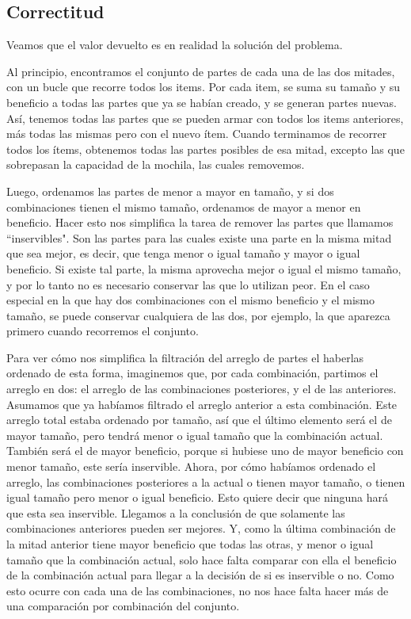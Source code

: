 \documentclass[10pt, a4paper]{article}
\begin{document}
\subsection{Correctitud}
Veamos que el valor devuelto es en realidad la solución del problema. \par
Al principio, encontramos el conjunto de partes de cada una de las dos mitades, con un bucle que recorre todos los items. Por cada item, se suma su tamaño y su beneficio a todas las partes que ya se habían creado, y se generan partes nuevas. Así, tenemos todas las partes que se pueden armar con todos los items anteriores, más todas las mismas pero con el nuevo ítem. Cuando terminamos de recorrer todos los ítems, obtenemos todas las partes posibles de esa mitad, excepto las que sobrepasan la capacidad de la mochila, las cuales removemos.\par
Luego, ordenamos las partes de menor a mayor en tamaño, y si dos combinaciones tienen el mismo tamaño, ordenamos de mayor a menor en beneficio. Hacer esto nos simplifica la tarea de remover las partes que llamamos ``inservibles". Son las partes para las cuales existe una parte en la misma mitad que sea mejor, es decir, que tenga menor o igual tamaño y mayor o igual beneficio. Si existe tal parte, la misma aprovecha mejor o igual el mismo tamaño, y por lo tanto no es necesario conservar las que lo utilizan peor. En el caso especial en la que hay dos combinaciones con el mismo beneficio y el mismo tamaño, se puede conservar cualquiera de las dos, por ejemplo, la que aparezca primero cuando recorremos el conjunto.\par
Para ver cómo nos simplifica la filtración del arreglo de partes el haberlas ordenado de esta forma, imaginemos que, por cada combinación, partimos el arreglo en dos: el arreglo de las combinaciones posteriores, y el de las anteriores. Asumamos que ya habíamos filtrado el arreglo anterior a esta combinación. Este arreglo total estaba ordenado por tamaño, así que el último elemento será el de mayor tamaño, pero tendrá menor o igual tamaño que la combinación actual. También será el de mayor beneficio, porque si hubiese uno de mayor beneficio con menor tamaño, este sería inservible. Ahora, por cómo habíamos ordenado el arreglo, las combinaciones posteriores a la actual o tienen mayor tamaño, o tienen igual tamaño pero menor o igual beneficio. Esto quiere decir que ninguna hará que esta sea inservible. Llegamos a la conclusión de que solamente las combinaciones anteriores pueden ser mejores. Y, como la última combinación de la mitad anterior tiene mayor beneficio que todas las otras, y menor o igual tamaño que la combinación actual, solo hace falta comparar con ella el beneficio de la combinación actual para llegar a la decisión de si es inservible o no. Como esto ocurre con cada una de las combinaciones, no nos hace falta hacer más de una comparación por combinación del conjunto.\par
\end{document}
